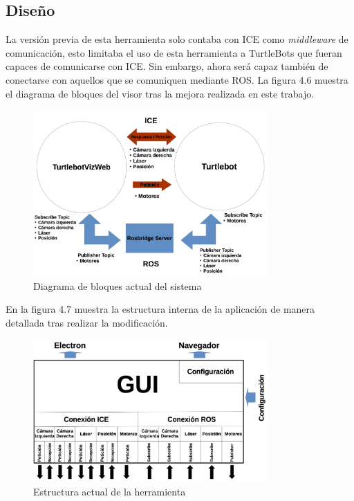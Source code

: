 \subsection{Diseño}
La versión previa de esta herramienta solo contaba con ICE como \textit{middleware} de comunicación, esto limitaba el uso de esta herramienta a TurtleBots que fueran capaces de comunicarse con ICE. Sin embargo, ahora será capaz también de conectarse con aquellos que se comuniquen mediante ROS. La figura 4.6 muestra el diagrama de bloques del visor tras la mejora realizada en este trabajo.

\begin{figure}[H]
  \begin{center}
    \includegraphics[width=0.8\textwidth]{figures/TurtleBot2.png}
		\caption{Diagrama de bloques actual del sistema}
		\label{fig.esquemaTurtleBot2}
		\end{center}
\end{figure}

En la figura 4.7 muestra la estructura interna de la aplicación de manera detallada tras realizar la modificación.

\begin{figure}[H]
  \begin{center}
    \includegraphics[width=0.8\textwidth]{figures/estrucuturaTurtleBotviz2.png}
		\caption{Estructura actual de la herramienta}
		\label{fig.estructuracamviz2}
		\end{center}
\end{figure}

